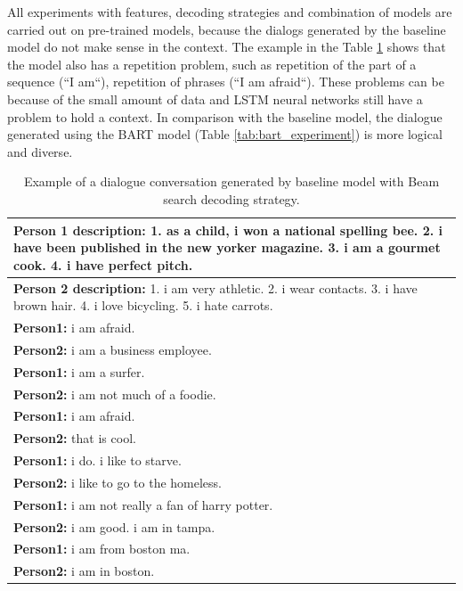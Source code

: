 All experiments with features, decoding strategies and combination of models are carried out on pre-trained models, because the dialogs generated by the baseline model do not make sense in the context. The example in the Table \ref{tab:baseline_experiment} shows that the model also has a repetition problem, such as repetition of the part of a sequence (``I am``), repetition of phrases (``I am afraid``). These problems can be because of the small amount of data and LSTM neural networks still have a problem to hold a context. In comparison with the baseline model, the dialogue generated using the BART model (Table \ref{tab:bart_experiment}) is more logical and diverse.

\begin{table}[ht]
\centering
 \begin{tabular}{|p{14cm}|}
 \hline
 \textbf{Person 1 description:} 1. as a child, i won a national spelling bee. 2. i have been published in the new yorker magazine. 3. i am a gourmet cook. 4. i have perfect pitch. \\
 \hline
 \textbf{Person 2 description:} 1. i am very athletic. 2. i wear contacts. 3. i have brown hair. 4. i love bicycling. 5. i hate carrots. \\
 \hline
 \textbf{Person1:} i am afraid. \\
 \textbf{Person2:} i am a business employee.  \\ 
 \textbf{Person1:} i am a surfer. \\
 \textbf{Person2:} i am not much of a foodie. \\
 \textbf{Person1:} i am afraid. \\
 \textbf{Person2:} that is cool. \\
 \textbf{Person1:} i do. i like to starve. \\
 \textbf{Person2:} i like to go to the homeless. \\
 \textbf{Person1:} i am not really a fan of harry potter. \\
 \textbf{Person2:} i am good. i am in tampa. \\
 \textbf{Person1:} i am from boston ma. \\
 \textbf{Person2:} i am in boston. \\
 \hline
 \end{tabular}
 \caption{Example of a dialogue conversation generated by baseline model with Beam search decoding strategy.}
\label{tab:baseline_experiment}
\end{table}

